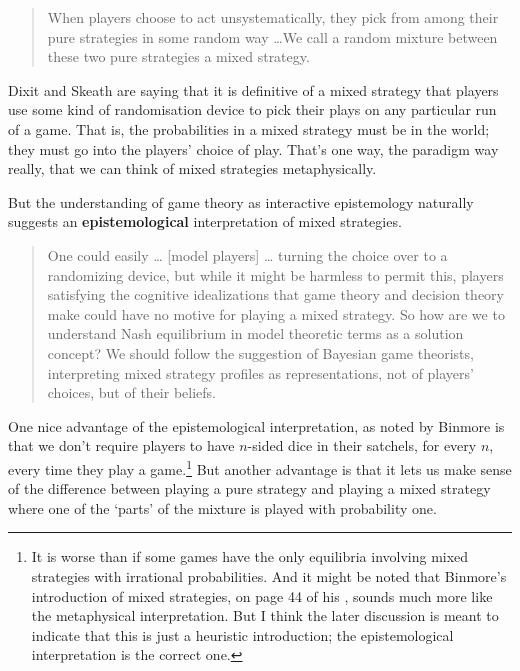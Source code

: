 \documentclass[11pt,]{book}
\let\rmarkdownfootnote\footnote%
\def\footnote{\protect\rmarkdownfootnote}
\begin{document}
\begin{quote}
When players choose to act unsystematically, they pick from among their pure strategies in some random way \ldots{}We call a random mixture between these two pure strategies a mixed strategy. \citep[ 186]{DixitSkeath2004}
\end{quote}

Dixit and Skeath are saying that it is definitive of a mixed strategy that players use some kind of randomisation device to pick their plays on any particular run of a game. That is, the probabilities in a mixed strategy must be in the world; they must go into the players' choice of play. That's one way, the paradigm way really, that we can think of mixed strategies metaphysically.

But the understanding of game theory as interactive epistemology naturally suggests an \textbf{epistemological} interpretation of mixed strategies.

\begin{quote}
One could easily \ldots{} {[}model players{]} \ldots{} turning the choice over to a randomizing device, but while it might be harmless to permit this, players satisfying the cognitive idealizations that game theory and decision theory make could have no motive for playing a mixed strategy. So how are we to understand Nash equilibrium in model theoretic terms as a solution concept? We should follow the suggestion of Bayesian game theorists, interpreting mixed strategy profiles as representations, not of players' choices, but of their beliefs. \citep[ 57-8]{Stalnaker1994}
\end{quote}

One nice advantage of the epistemological interpretation, as noted by Binmore \citeyearpar[ 185]{Binmore2007} is that we don't require players to have \(n\)-sided dice in their satchels, for every \(n\), every time they play a game.\footnote{It is worse than if some games have the only equilibria involving mixed strategies with irrational probabilities. And it might be noted that Binmore's introduction of mixed strategies, on page 44 of his \citeyearpar{Binmore2007}, sounds much more like the metaphysical interpretation. But I think the later discussion is meant to indicate that this is just a heuristic introduction; the epistemological interpretation is the correct one.} But another advantage is that it lets us make sense of the difference between playing a pure strategy and playing a mixed strategy where one of the `parts' of the mixture is played with probability one.
\end{document}
